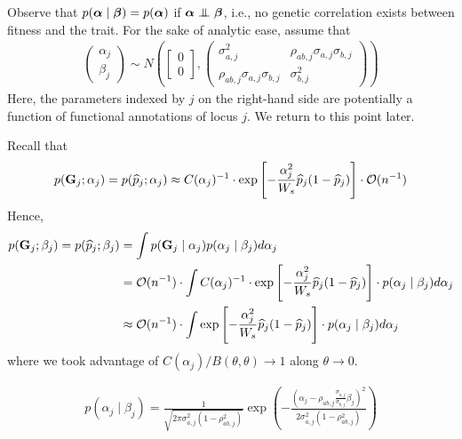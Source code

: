 \documentclass[10pt]{article}
\begin{document}
Observe that $p(\boldsymbol{\alpha} \mid \boldsymbol{\beta}) = p(\boldsymbol{\alpha})$ if $\balpha \indep \bbeta$, i.e., no genetic correlation exists between fitness and the trait.
For the sake of analytic ease,
assume that
\begin{align}
    \begin{pmatrix}
        \alpha_j \\
        \beta_j
    \end{pmatrix}
    \sim
    N\left(
    \begin{bmatrix}
        0 \\
        0
    \end{bmatrix}
    , 
    \begin{pmatrix}
        \sigma_{a,j}^2 & \rho_{ab,j}\sigma_{a,j}\sigma_{b,j} \\
        \rho_{ab,j} \sigma_{a,j} \sigma_{b,j} & \sigma_{b,j}^2
    \end{pmatrix} 
    \right)
\end{align}
Here, the parameters indexed by $j$ on the right-hand side are potentially a function of functional annotations of locus $j$.
We return to this point later.

Recall that
\begin{align}
    p(\mathbf{G}_j ; \alpha_j) = p(\widehat{p}_j ; \alpha_j) \approx
    C(\alpha_j)^{-1} \cdot 
    \exp \left[
        -\frac{\alpha_j^2}{W_s}\widehat{p}_j(1-\widehat{p}_j)
    \right] \cdot \mathcal{O}(n^{-1})
\end{align}
Hence,
\begin{align}
    p(\mathbf{G}_j; \beta_j) = p(\widehat{p}_j ; \beta_j) &= \int p(\mathbf{G}_j \mid \alpha_j) p(\alpha_j \mid \beta_j) d\alpha_j \\
    &= 
    \mathcal{O}(n^{-1}) \cdot
    \int 
    C(\alpha_j)^{-1} \cdot
    \exp \left[
        -\frac{\alpha_j^2}{W_s}\widehat{p}_j(1-\widehat{p}_j)    
    \right]
    \cdot
    p(\alpha_j \mid \beta_j) d\alpha_j \\
    &\approx
    \mathcal{O}(n^{-1}) \cdot
    \int 
    \exp \left[
        -\frac{\alpha_j^2}{W_s}\widehat{p}_j(1-\widehat{p}_j)    
    \right]
    \cdot
    p(\alpha_j \mid \beta_j) d\alpha_j
\end{align}
where we took advantage of $C(\alpha_j) / B(\theta, \theta) \rightarrow 1$ along $\theta \rightarrow 0$.

\begin{align}
    p(\alpha_j \mid \beta_j) 
    = \frac{1}{\sqrt{2\pi \sigma_{a,j}^2 (1 - \rho_{ab,j}^2)}} 
    \exp \left( -\frac{\left( \alpha_j - \rho_{ab,j} \frac{\sigma_{a,j}}{\sigma_{b,j}} \beta_j \right)^2}{2 \sigma_{a,j}^2 (1 - \rho_{ab,j}^2)} \right)
\end{align}
\end{document}

